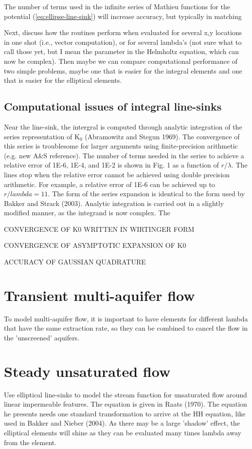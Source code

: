 \documentclass{elsart}
\begin{document}
The number of terms used in the infinite series of Mathieu functions for the potential (\ref{eq:ellipse-line-sink}) will increase accuracy, but typically in matching

Next, discuss how the routines perform when evaluated for several x,y locations in one shot (i.e., vector computation), or for several lambda's (not sure what to call those yet, but I mean the parameter in the Helmholtz equation, which can now be complex).  Then maybe we can compare computational performance of two simple problems, maybe one that is easier for the integral elements and one that is easier for the elliptical elements.

\subsection{Computational issues of integral line-sinks}
Near the line-sink, the intergral is computed through analytic integration of the series representation of K$_0$ (Abramowitz and Stegun 1969). The convergence of this series is troublesome for larger arguments using finite-precision arithmetic (e.g. new A\&S reference). The number of terms needed in the series to achieve a relative error of 1E-6, 1E-4, and 1E-2 is shown in Fig. 1 as a function of $r/\lambda$. The lines stop when the relative error cannot be achieved using double precision arithmetic. For example, a relative error of 1E-6 can be achieved up to $r/lambda=11$. The form of the series expansion is identical to the form used by Bakker and Strack (2003). Analytic integration is carried out in a slightly modified manner, as the integrand is now complex. The 

CONVERGENCE OF K0 WRITTEN IN WIRTINGER FORM

CONVERGENCE OF ASYMPTOTIC EXPANSION OF K0

ACCURACY OF GAUSSIAN QUADRATURE

\section{Transient multi-aquifer flow}
To model multi-aquifer flow, it is important to have elements for different lambda that have the same extraction rate, so they can be combined to cancel the flow in the 'unscreened' aquifers. 

\section{Steady unsaturated flow}
Use elliptical line-sinks to model the stream function for unsaturated flow around linear impermeable features. The equation is given in Raats (1970). The equation he presents needs one standard transformation to arrive at the HH equation, like used in Bakker and Nieber (2004). As there may be a large 'shadow' effect, the elliptical elements will shine as they can be evaluated many times lambda away from the element.
\end{document}
